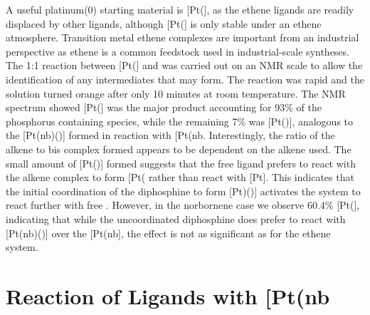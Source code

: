 A useful platinum(0) starting material is [Pt(], as the ethene ligands are readily displaced by other ligands, although [Pt(] is only stable under an ethene atmosphere.\cite{Harrison1978, Howard1983} Transition metal ethene complexes are important from an industrial perspective as ethene is a common feedstock used in industrial-scale syntheses.\cite{Yoneda2001, Degnan2001}  The 1:1 reaction between [Pt(] and \Phthixantphos{} was carried out on an NMR scale to allow the identification of any intermediates that may form.  The reaction was rapid and the solution turned orange after only 10 minutes at room temperature.  The \phosphorus{} NMR spectrum showed [Pt(\Phthixantphos{}] was the major product accounting for 93\% of the phosphorus containing species, while the remaining 7\% was [Pt(\Phthixantphos)], analogous to the [Pt(nb)(\Phthixantphos)] formed in reaction with [Pt(nb\ce{)3]}.  Interestingly, the ratio of the alkene to bis complex formed appears to be dependent on the alkene used.  The small amount of [Pt(\Phthixantphos)] formed suggests that the free ligand prefers to react with the alkene complex to form [Pt(\Phthixantphos\ce{)2]} rather than react with [Pt].  This indicates that the initial coordination of the diphosphine to form [Pt)(\Phthixantphos)] activates the system to react further with free \Phthixantphos.  However, in the norbornene case we observe 60.4\% [Pt(\Phthixantphos{}], indicating that while the uncoordinated diphosphine does prefer to react with [Pt(nb)(\Phthixantphos)] over the [Pt(nb], the effect is not as significant as for the ethene system.  

%

\section{Reaction of \tBuxantphos{} Ligands with \texorpdfstring{[Pt(nb\ce{)3]}} P}  

